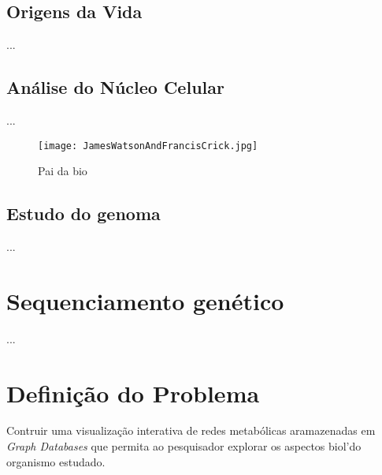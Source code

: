 

\subsection{Origens da Vida}

\indent ...

\subsection{Análise do Núcleo Celular}

\indent ...

\vspace{1cm}
 \begin{figure}[h!]
     \centering
     \texttt{[image: JamesWatsonAndFrancisCrick.jpg]}
     \caption{Pai da bio}
     \label{fig:JamesWatsonAndFrancisCrick}
 \end{figure}
\vspace{1cm}

\subsection{Estudo do genoma}

\indent ... 




\section{Sequenciamento genético}

\indent ...


\section{Definição do Problema}

\indent 



Contruir uma visualizaç\~ao interativa de redes metab\'olicas aramazenadas em \textit{Graph Databases} que permita ao pesquisador explorar os aspectos biol'\ogicos do organismo estudado.



